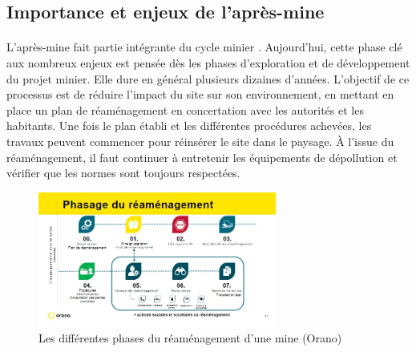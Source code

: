 \documentclass{article}
\begin{document}
\subsection{Importance et enjeux de l'après-mine}
\paragraph{} L’après-mine fait partie intégrante du cycle minier \cite{himeur_apres-mine_2020}. Aujourd’hui, cette phase clé aux nombreux enjeux est pensée dès les phases d’exploration et de développement du projet minier. Elle dure en général plusieurs dizaines d’années. L’objectif de ce processus est de réduire l’impact du site sur son environnement, en mettant en place un plan de réaménagement en concertation avec les autorités et les habitants. Une fois le plan établi et les différentes procédures achevées, les travaux peuvent commencer pour réinsérer le site dans le paysage. À l’issue du réaménagement, il faut continuer à entretenir les équipements de dépollution et vérifier que les normes sont toujours respectées.


\begin{figure}[H]
    \centering
    \includegraphics[width=0.7\textwidth]{I_B_1.jpg}
    \caption{Les différentes phases du réaménagement d'une mine (Orano)}
    \label{fig:phases_reamenagement}
\end{figure}
\end{document}

